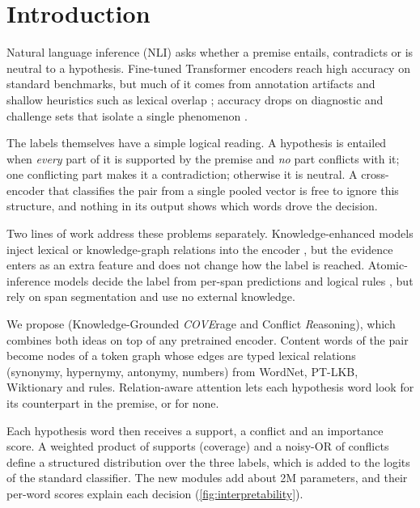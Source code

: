 \section{Introduction}
\label{sec:intro}

Natural language inference (NLI) asks whether a premise entails, contradicts or is neutral to a
hypothesis. Fine-tuned Transformer encoders reach high accuracy on standard benchmarks, but much of it
comes from annotation artifacts and shallow heuristics such as lexical overlap
\citep{gururangan2018annotation,mccoy2019right}; accuracy drops on diagnostic and challenge sets that
isolate a single phenomenon \citep{glockner2018breaking,wang2019superglue}.

The labels themselves have a simple logical reading. A hypothesis is entailed when \emph{every} part of
it is supported by the premise and \emph{no} part conflicts with it; one conflicting part makes it a
contradiction; otherwise it is neutral. A cross-encoder that classifies the pair from a single pooled
vector is free to ignore this structure, and nothing in its output shows which words drove the decision.

Two lines of work address these problems separately. Knowledge-enhanced models inject lexical or
knowledge-graph relations into the encoder \citep{chen2018neural,liu2020kbert,song2020kganet,wang2020knowledge},
but the evidence enters as an extra feature and does not change how the label is reached. Atomic-inference
models decide the label from per-span predictions and logical rules \citep{stacey2022logical,wu2023weakly},
but rely on span segmentation and use no external knowledge.

We propose \model{} (Knowledge-Grounded \emph{COVE}rage and Conflict \emph{R}easoning), which combines
both ideas on top of any pretrained encoder. Content words of the pair become nodes of a token graph whose
edges are typed lexical relations (synonymy, hypernymy, antonymy, numbers) from WordNet, PT-LKB,
Wiktionary and rules. Relation-aware attention lets each hypothesis word look for its counterpart in the
premise, or for none.

Each hypothesis word then receives a support, a conflict and an importance score. A weighted product of
supports (coverage) and a noisy-OR of conflicts define a structured distribution over the three labels,
which is added to the logits of the standard \cls{} classifier. The new modules add about 2M parameters,
and their per-word scores explain each decision (\cref{fig:interpretability}).

